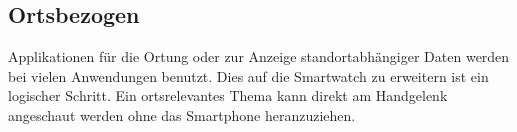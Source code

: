 \subsection{Ortsbezogen}
Applikationen für die Ortung oder zur Anzeige standortabhängiger Daten werden bei vielen Anwendungen benutzt. Dies auf die Smartwatch zu erweitern ist ein logischer Schritt. Ein ortsrelevantes Thema kann direkt am Handgelenk angeschaut werden ohne das Smartphone heranzuziehen.
